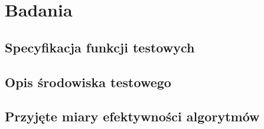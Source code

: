 \newpage
\chapter{Badania}

\section{Specyfikacja funkcji testowych}

\section{Opis środowiska testowego}

\section{Przyjęte miary efektywności algorytmów}
\label{sec:przyjete_miary_efektywnosci_algorytmow}